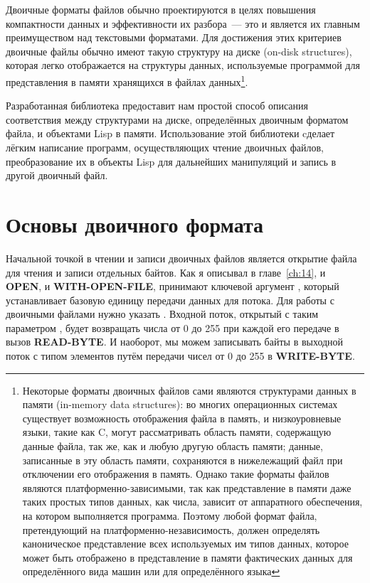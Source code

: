 Двоичные форматы файлов обычно проектируются в целях повышения компактности данных и
эффективности их разбора~--- это и является их главным преимуществом над текстовыми
форматами. Для достижения этих критериев двоичные файлы обычно имеют такую структуру на
диске (on-disk structures), которая легко отображается на структуры данных, используемые
программой для представления в памяти хранящихся в файлах данных\footnote{Некоторые
  форматы двоичных файлов сами являются структурами данных в памяти (in-memory data
  structures): во многих операционных системах существует возможность отображения файла в
  память, и низкоуровневые языки, такие как C, могут рассматривать область памяти,
  содержащую данные файла, так же, как и любую другую область памяти; данные, записанные в
  эту область памяти, сохраняются в нижележащий файл при отключении его отображения в
  память. Однако такие форматы файлов являются платформенно-зависимыми, так как
  представление в памяти даже таких простых типов данных, как числа, зависит от
  аппаратного обеспечения, на котором выполняется программа. Поэтому любой формат файла,
  претендующий на платформенно-независимость, должен определять каноническое представление
  всех используемых им типов данных, которое может быть отображено в представление в
  памяти фактических данных для определённого вида машин или для определённого языка}.

Разработанная библиотека предоставит нам простой способ описания соответствия между
структурами на диске, определённых двоичным форматом файла, и объектами Lisp в
памяти. Использование этой библиотеки cделает лёгким написание программ, осуществляющих
чтение двоичных файлов, преобразование их в объекты Lisp для дальнейших манипуляций и
запись в другой двоичный файл.

\section{Основы двоичного формата}

Начальной точкой в чтении и записи двоичных файлов является открытие файла для чтения и
записи отдельных байтов. Как я описывал в главе~\ref{ch:14}, и \textbf{OPEN}, и
\textbf{WITH-OPEN-FILE}, принимают ключевой аргумент , который
устанавливает базовую единицу передачи данных для потока. Для работы с двоичными файлами
нужно указать . Входной поток, открытый с таким параметром
, будет возвращать числа от 0 до 255 при каждой его передаче в вызов
\textbf{READ-BYTE}. И наоборот, мы можем записывать байты в выходной поток с типом
элементов  путём передачи чисел от 0 до 255 в \textbf{WRITE-BYTE}.

